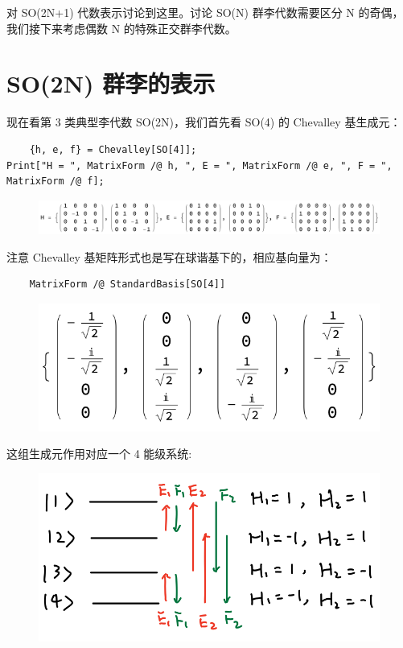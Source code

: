 \documentclass[UTF8]{ctexart}
\begin{document}
\noindent 对 SO(2N+1) 代数表示讨论到这里。讨论 SO(N) 群李代数需要区分 N 的奇偶，我们接下来考虑偶数 N 的特殊正交群李代数。

\section*{SO(2N) 群李的表示}
\noindent 现在看第 3 类典型李代数 SO(2N)，我们首先看 SO(4) 的 Chevalley 基生成元：
\begin{verbatim}
	{h, e, f} = Chevalley[SO[4]];
Print["H = ", MatrixForm /@ h, ", E = ", MatrixForm /@ e, ", F = ", MatrixForm /@ f];
\end{verbatim}
\begin{figure}[H]
\begin{centering}
\includegraphics[width=0.95\linewidth]{include/O15}
\par\end{centering}
\end{figure}

\noindent 注意 Chevalley 基矩阵形式也是写在球谐基下的，相应基向量为：

\begin{verbatim}
	MatrixForm /@ StandardBasis[SO[4]]
\end{verbatim}

\begin{figure}[H]
\begin{centering}
\includegraphics[width=0.5\linewidth]{include/O16}
\par\end{centering}
\end{figure}

\noindent 这组生成元作用对应一个 4 能级系统:

\begin{figure}[H]
\begin{centering}
\includegraphics[width=0.5\linewidth]{include/P5}
\par\end{centering}
\end{figure}
\end{document}

